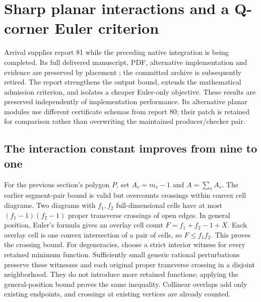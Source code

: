 \section{Sharp planar interactions and a Q-corner Euler criterion}
\label{sec:planar-overlay-refinements}

Arrival  supplies report 81 while the preceding native
integration is being completed. Its full delivered manuscript, PDF,
alternative implementation and evidence are preserved by placement
; the committed archive is subsequently retired.
The report strengthens the output bound, extends the mathematical admission
criterion, and isolates a cheaper Euler-only objective. These results are
preserved independently of implementation performance. Its alternative
planar modules use different certificate schemas from report 80; their
patch is retained for comparison rather than overwriting the maintained
producer/checker pair.

\subsection{The interaction constant improves from nine to one}

For the previous section's polygon $P$, set $A_v=m_v-1$ and $A=\sum_vA_v$.
The earlier segment-pair bound is valid but overcounts crossings within
convex cell diagrams. Two diagrams with $f_1,f_2$ full-dimensional cells
have at most $(f_1-1)(f_2-1)$ proper transverse crossings of open edges.
In general position, Euler's formula gives an overlay cell count
$F=f_1+f_2-1+X$. Each overlay cell is one convex intersection of a pair
of cells, so $F\le f_1f_2$. This proves the crossing bound.
For degeneracies, choose a strict interior witness for every retained
minimum function. Sufficiently small generic rational perturbations
preserve these witnesses and each original proper transverse crossing
in a disjoint neighborhood. They do not introduce more retained functions;
applying the general-position bound proves the same inequality. Collinear
overlaps add only existing endpoints, and crossings at existing vertices
are already counted.

